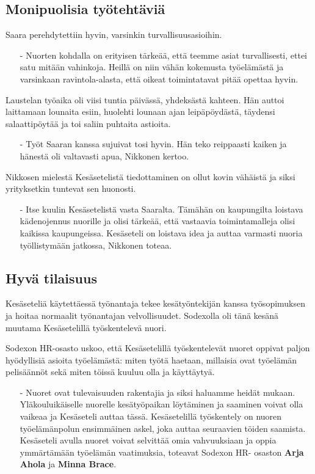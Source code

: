 \documentclass[a4paper,11pt]{article}
\newcommand{\note}[1]{\textbf{#1}}
\begin{document}
  \subsection{Monipuolisia työtehtäviä}
  Saara perehdytettiin hyvin, varsinkin turvallisuusasioihin.
  \begin{itemize}
    \item[-] Nuorten kohdalla on erityisen tärkeää, että
    teemme asiat turvallisesti, ettei satu mitään vahinkoja.
    Heillä on niin vähän kokemusta työelämästä ja varsinkaan
    ravintola-alasta, että oikeat toimintatavat pitää opettaa
    hyvin.
  \end{itemize}
  Laustelan työaika oli viisi tuntia päivässä, yhdeksästä
  kahteen. Hän auttoi laittamaan lounaita esiin, huolehti
  lounaan ajan leipäpöydästä, täydensi salaattipöytää ja
  toi saliin puhtaita astioita.
  \begin{itemize}
    \item[-] Työt Saaran kanssa sujuivat tosi hyvin. Hän
    teko reippaasti kaiken ja hänestä oli valtavasti apua,
    Nikkonen kertoo.
  \end{itemize}
  Nikkosen mielestä Kesäsetelistä tiedottaminen on ollut
  kovin vähäistä ja siksi yrityksetkin tuntevat sen
  huonosti.
  \begin{itemize}
    \item[-] Itse kuulin Kesäsetelistä vasta Saaralta. Tämähän
    on kaupungilta loistava kädenojennus nuorille ja olisi
    tärkeää, että vastaavia toimintamalleja olisi kaikissa
    kaupungeissa. Kesäseteli on loistava idea ja auttaa
    varmasti nuoria työllistymään jatkossa, Nikkonen toteaa.
  \end{itemize}
  \subsection{Hyvä tilaisuus}
  Kesäseteliä käytettäessä työnantaja tekee kesätyöntekijän
  kanssa työsopimuksen ja hoitaa normaalit työnantajan
  velvollisuudet. Sodexolla oli tänä kesänä muutama
  Kesäsetelillä työskentelevä nuori.
  \par
  Sodexon HR-osasto uskoo, että Kesäsetelillä työskentelevät
  nuoret oppivat paljon hyödyllisiä asioita työelämästä: miten
  työtä haetaan, millaisia ovat työelämän pelisäännöt sekä
  miten töissä kuuluu olla ja käyttäytyä.
  \begin{itemize}
    \item[-] Nuoret ovat tulevaisuuden rakentajia ja siksi
    haluamme heidät mukaan. Yläkouluikäiselle nuorelle
    kesätyöpaikan löytäminen ja saaminen voivat olla
    vaikeaa ja Kesäseteli auttaa tässä. Kesäsetelillä
    työskentely on nuoren työelämänpolun ensimmäinen askel,
    joka auttaa seuraavien töiden saamista. Kesäseteli avulla
    nuoret voivat selvittää omia vahvuuksiaan ja oppia
    ymmärtämään työelämän vaatimuksia, toteavat Sodexon HR-%
    osaston \note{Arja Ahola} ja \note{Minna Brace}.
  \end{itemize}
\end{document}
